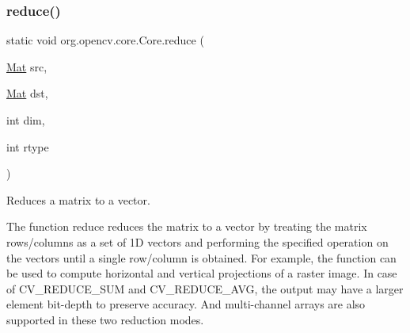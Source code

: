 \subsubsection{\texorpdfstring{reduce()}{reduce()}\hspace{0.1cm}{\footnotesize\ttfamily [2/2]}}
{\footnotesize\ttfamily static void org.\+opencv.\+core.\+Core.\+reduce (\begin{DoxyParamCaption}\item[{\mbox{\hyperlink{classorg_1_1opencv_1_1core_1_1_mat}{Mat}}}]{src,  }\item[{\mbox{\hyperlink{classorg_1_1opencv_1_1core_1_1_mat}{Mat}}}]{dst,  }\item[{int}]{dim,  }\item[{int}]{rtype }\end{DoxyParamCaption})\hspace{0.3cm}{\ttfamily [static]}}

Reduces a matrix to a vector.

The function {\ttfamily reduce} reduces the matrix to a vector by treating the matrix rows/columns as a set of 1D vectors and performing the specified operation on the vectors until a single row/column is obtained. For example, the function can be used to compute horizontal and vertical projections of a raster image. In case of {\ttfamily C\+V\+\_\+\+R\+E\+D\+U\+C\+E\+\_\+\+S\+UM} and {\ttfamily C\+V\+\_\+\+R\+E\+D\+U\+C\+E\+\_\+\+A\+VG}, the output may have a larger element bit-\/depth to preserve accuracy. And multi-\/channel arrays are also supported in these two reduction modes.


